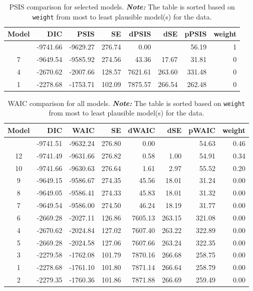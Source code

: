 \documentclass[
  authoryear,
  preprint,
  1p]{elsarticle}
\begin{document}
\begin{longtable}[]{@{}crrrrrrr@{}}

\caption{\label{tbl-rq1-psis}PSIS comparison for selected models.
\textbf{\emph{Note:}} The table is sorted based on \texttt{weight} from
most to least plausible model(s) for the data.}

\tabularnewline

\toprule\noalign{}
Model & DIC & PSIS & SE & dPSIS & dSE & pPSIS & weight \\
\midrule\noalign{}
\endhead
\bottomrule\noalign{}
\endlastfoot
10 & -9741.66 & -9629.27 & 276.74 & 0.00 & & 56.19 & 1 \\
7 & -9649.54 & -9585.92 & 274.56 & 43.36 & 17.67 & 31.81 & 0 \\
4 & -2670.62 & -2007.66 & 128.57 & 7621.61 & 263.60 & 331.48 & 0 \\
1 & -2278.68 & -1753.71 & 102.09 & 7875.57 & 266.54 & 262.48 & 0 \\

\end{longtable}

\begin{longtable}[]{@{}crrrrrrr@{}}

\caption{\label{tbl-rq3-waic}WAIC comparison for all models.
\textbf{\emph{Note:}} The table is sorted based on \texttt{weight} from
most to least plausible model(s) for the data.}

\tabularnewline

\toprule\noalign{}
Model & DIC & WAIC & SE & dWAIC & dSE & pWAIC & weight \\
\midrule\noalign{}
\endhead
\bottomrule\noalign{}
\endlastfoot
11 & -9741.51 & -9632.24 & 276.80 & 0.00 & & 54.63 & 0.46 \\
12 & -9741.49 & -9631.66 & 276.82 & 0.58 & 1.00 & 54.91 & 0.34 \\
10 & -9741.66 & -9630.63 & 276.64 & 1.61 & 2.97 & 55.52 & 0.20 \\
9 & -9649.15 & -9586.67 & 274.35 & 45.56 & 18.01 & 31.24 & 0.00 \\
8 & -9649.05 & -9586.41 & 274.33 & 45.83 & 18.01 & 31.32 & 0.00 \\
7 & -9649.54 & -9586.00 & 274.50 & 46.24 & 18.19 & 31.77 & 0.00 \\
6 & -2669.28 & -2027.11 & 126.86 & 7605.13 & 263.15 & 321.08 & 0.00 \\
4 & -2670.62 & -2024.84 & 127.02 & 7607.40 & 263.22 & 322.89 & 0.00 \\
5 & -2669.28 & -2024.58 & 127.06 & 7607.66 & 263.24 & 322.35 & 0.00 \\
3 & -2279.58 & -1762.08 & 101.79 & 7870.16 & 266.68 & 258.75 & 0.00 \\
1 & -2278.68 & -1761.10 & 101.80 & 7871.14 & 266.64 & 258.79 & 0.00 \\
2 & -2279.35 & -1760.36 & 101.86 & 7871.88 & 266.69 & 259.49 & 0.00 \\

\end{longtable}
\end{document}

